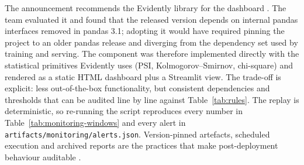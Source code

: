 The announcement recommends the Evidently library for the dashboard
\citep{evidently2026}. The team evaluated it and found that the released version
depends on internal pandas interfaces removed in pandas 3.1; adopting it would have
required pinning the project to an older pandas release and diverging from the
dependency set used by training and serving. The component was therefore implemented
directly with the statistical primitives Evidently uses (PSI, Kolmogorov--Smirnov,
chi-square) and rendered as a static HTML dashboard plus a Streamlit view. The
trade-off is explicit: less out-of-the-box functionality, but consistent dependencies
and thresholds that can be audited line by line against Table~\ref{tab:rules}. The replay is deterministic, so re-running the script
reproduces every number in Table~\ref{tab:monitoring-windows} and every alert in
\texttt{artifacts/monitoring/alerts.json}. Version-pinned artefacts, scheduled
execution and archived reports are the practices that make post-deployment behaviour
auditable \citep{sculley2015,gama2014conceptdrift}.
